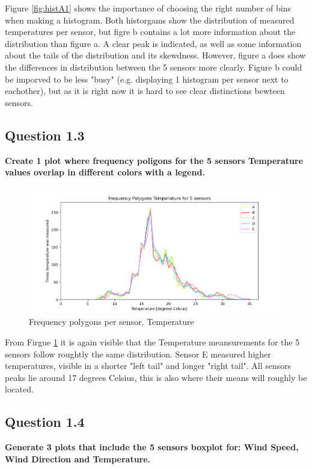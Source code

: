 \documentclass{report}
\begin{document}
	Figure \ref{fig:histA1} shows the importance of choosing the right number of bins when making a histogram. Both historgams show the distribution of measured temperatures per sensor, but figre b contains a lot more information about the distribution than figure a. A clear peak is indicated, as well as some information about the tails of the distribution and its skewdness. However, figure a does show the differences in distribution between the 5 sensors more clearly. Figure b could be imporved to be less "busy" (e.g. displaying 1 histogram per sensor next to eachother), but as it is right now it is hard to see clear distinctions bewteen sensors.
	
	\subsection{Question 1.3}
	\textbf{Create 1 plot where frequency poligons for the 5 sensors Temperature values overlap in different colors with a legend.}
	
	\begin{figure}[h!]
		\includegraphics[width=\linewidth]{GEO1001_hw01_images/GEO1001_hw01_A1_polygons.png}
		\caption{Frequency polygons per sensor, Temperature}
		\label{fig:freqpols}
	\end{figure}

	From Firgue \ref{fig:freqpols} it is again visible that the Temperature meansurements for the 5 sensors follow roughtly the same distribution. Sensor E measured higher temperatures, visible in a shorter "left tail" and longer "right tail". All sensors peaks lie around 17 degrees Celsius, this is also where their means will roughly be located.
	
	\subsection{Question 1.4}
	\textbf{Generate 3 plots that include the 5 sensors boxplot for: Wind Speed, Wind Direction and Temperature.}
	
\end{document}
